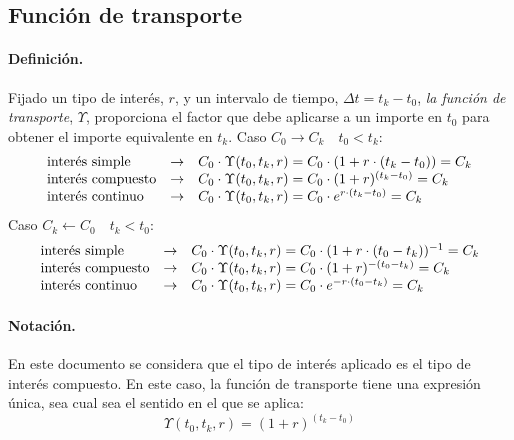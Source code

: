 \subsection{Funci\'on de transporte}

\paragraph{Definici\'on.} Fijado un tipo de inter\'es, $r$, y un intervalo de
tiempo, $\Delta t = t_k-t_0$, \emph{la funci\'on de transporte},
$\Upsilon$, proporciona el factor que debe aplicarse a un importe en $t_0$ para obtener el
importe equivalente en $t_k$.
\newline
\newline
Caso $C_0 \longrightarrow C_k \quad t_0 < t_k$:
\begin{displaymath}
\begin{array}{lcl}
\textrm{inter\'es simple}    & \rightarrow & C_0 \cdot \Upsilon(t_0,t_k, r) = C_0 \cdot (1+r\cdot(t_k-t_0)) = C_k \cr
\textrm{inter\'es compuesto} & \rightarrow & C_0 \cdot \Upsilon(t_0,t_k, r) = C_0 \cdot (1+r)^{(t_k-t_0)} = C_k \cr
\textrm{inter\'es continuo}  & \rightarrow & C_0 \cdot \Upsilon(t_0,t_k, r) = C_0 \cdot e^{r\cdot(t_k-t_0)} = C_k 
\end{array}
\end{displaymath}
Caso $C_k \longleftarrow C_0 \quad t_k < t_0$:
\begin{displaymath}
\begin{array}{lcl}
\textrm{inter\'es simple}    & \rightarrow & C_0 \cdot \Upsilon(t_0,t_k, r) = C_0 \cdot (1+r\cdot(t_0-t_k))^{-1} = C_k \cr
\textrm{inter\'es compuesto} & \rightarrow & C_0 \cdot \Upsilon(t_0,t_k, r) = C_0 \cdot (1+r)^{-(t_0-t_k)} = C_k \cr
\textrm{inter\'es continuo}  & \rightarrow & C_0 \cdot \Upsilon(t_0,t_k, r) = C_0 \cdot e^{-r\cdot(t_0-t_k)} = C_k
\end{array}
\end{displaymath}

\paragraph{Notaci\'on.} En este documento se considera que el tipo de inter\'es
aplicado es el tipo de inter\'es compuesto. En este caso, la funci\'on de transporte
tiene una expresi\'on \'unica, sea cual sea el sentido en el que se aplica:
\begin{displaymath}
\Upsilon(t_0,t_k, r) = (1+r)^{(t_k-t_0)}
\end{displaymath}


